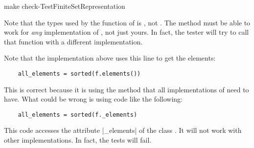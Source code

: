 \begin{console}
	make check-TestFiniteSetRepresentation
\end{console}

Note that the types used by the function  of  is \FiniteSet,
not .
The method must be able to work for \emph{any} implementation of  \FiniteSet,
not just yours.
In fact, the tester will try to call that function with a different implementation.

Note that the implementation above uses this line to get the elements:

\begin{verbatim}
    all_elements = sorted(f.elements())
\end{verbatim}

This is correct because it is using the method  that all implementations of \FiniteSet need to have.
What could be wrong is using code like the following:

\begin{verbatim}
    all_elements = sorted(f._elements)
\end{verbatim}

This code accesses the attribute \pystr|_elements| of the class .
It will not work with other implementations.
In fact, the tests will fail.
